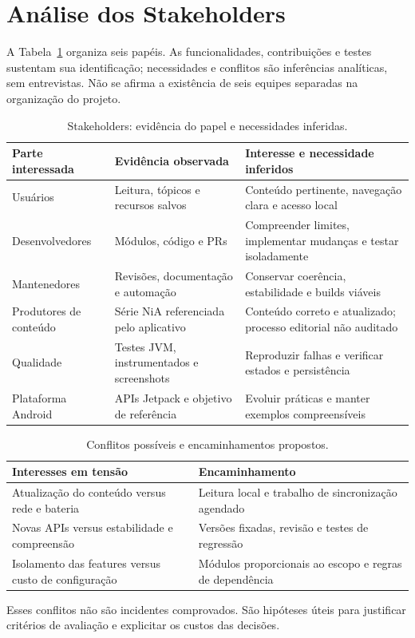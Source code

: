 \section{Análise dos Stakeholders}\label{sec:stakeholders}
A Tabela~\ref{tab:stakeholders} organiza seis papéis. As funcionalidades,
contribuições e testes sustentam sua identificação; necessidades e conflitos
são inferências analíticas, sem entrevistas. Não se afirma a existência de
seis equipes separadas na organização do projeto.

\begin{table}[t]
\caption{Stakeholders: evidência do papel e necessidades inferidas.}
\label{tab:stakeholders}
\centering
\begin{tabularx}{\textwidth}{@{}lXX@{}}
\toprule
Parte interessada & Evidência observada & Interesse e necessidade inferidos \\
\midrule
Usuários & Leitura, tópicos e recursos salvos & Conteúdo pertinente, navegação clara e acesso local \\
Desenvolvedores & Módulos, código e PRs & Compreender limites, implementar mudanças e testar isoladamente \\
Mantenedores & Revisões, documentação e automação & Conservar coerência, estabilidade e builds viáveis \\
Produtores de conteúdo & Série NiA referenciada pelo aplicativo & Conteúdo correto e atualizado; processo editorial não auditado \\
Qualidade & Testes JVM, instrumentados e screenshots & Reproduzir falhas e verificar estados e persistência \\
Plataforma Android & APIs Jetpack e objetivo de referência & Evoluir práticas e manter exemplos compreensíveis \\
\bottomrule
\end{tabularx}
\end{table}

\begin{table}[htb]
\caption{Conflitos possíveis e encaminhamentos propostos.}
\label{tab:conflitos}
\centering
\begin{tabularx}{\columnwidth}{@{}XX@{}}
\toprule
Interesses em tensão & Encaminhamento \\
\midrule
Atualização do conteúdo versus rede e bateria & Leitura local e trabalho de sincronização agendado \\
Novas APIs versus estabilidade e compreensão & Versões fixadas, revisão e testes de regressão \\
Isolamento das features versus custo de configuração & Módulos proporcionais ao escopo e regras de dependência \\
\bottomrule
\end{tabularx}
\end{table}

Esses conflitos não são incidentes comprovados. São hipóteses úteis para
justificar critérios de avaliação e explicitar os custos das decisões.
